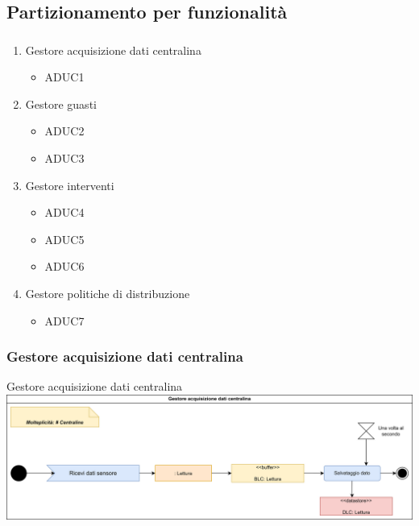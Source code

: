 \documentclass{beamer}
\begin{document}
	\subsection{Partizionamento
		per funzionalità}\label{part_funz}
	\begin{frame}
		\frametitle{}
		\begin{block}{}
		 	\begin{enumerate}
		 		\item Gestore acquisizione dati centralina
		 		\begin{itemize}
		 			\item ADUC1
		 		\end{itemize}
	 			\item Gestore guasti
	 			\begin{itemize}
	 				\item ADUC2
	 				\item ADUC3
	 			\end{itemize}
 				\item Gestore interventi
 				\begin{itemize}
 					\item ADUC4
 					\item ADUC5
 					\item ADUC6
 				\end{itemize}
 			 	\item Gestore politiche di distribuzione
 				\begin{itemize}
					\item ADUC7
 				\end{itemize}
		 	\end{enumerate}
		\end{block}
	\end{frame}


	\begin{frame}
	\subsubsection{Gestore acquisizione dati centralina}	
	\begin{block}{Gestore acquisizione dati centralina}
		\includegraphics[width=\textwidth, height=0.85\textheight, keepaspectratio=true]{comp1.png}
	\end{block}
	\end{frame}	
\end{document}
